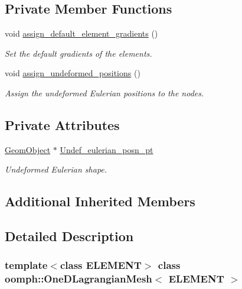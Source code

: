 \subsection*{Private Member Functions}
\begin{DoxyCompactItemize}
\item 
void \hyperlink{classoomph_1_1OneDLagrangianMesh_a7a4eabf4901a90b3015d2620fc70f648}{assign\+\_\+default\+\_\+element\+\_\+gradients} ()
\begin{DoxyCompactList}\small\item\em Set the default gradients of the elements. \end{DoxyCompactList}\item 
void \hyperlink{classoomph_1_1OneDLagrangianMesh_a1eebb0eddd75a7c2847615c05b5fb4d8}{assign\+\_\+undeformed\+\_\+positions} ()
\begin{DoxyCompactList}\small\item\em Assign the undeformed Eulerian positions to the nodes. \end{DoxyCompactList}\end{DoxyCompactItemize}
\subsection*{Private Attributes}
\begin{DoxyCompactItemize}
\item 
\hyperlink{classoomph_1_1GeomObject}{Geom\+Object} $\ast$ \hyperlink{classoomph_1_1OneDLagrangianMesh_af9b27f687d7ec160a01d6ed8c07570ed}{Undef\+\_\+eulerian\+\_\+posn\+\_\+pt}
\begin{DoxyCompactList}\small\item\em Undeformed Eulerian shape. \end{DoxyCompactList}\end{DoxyCompactItemize}
\subsection*{Additional Inherited Members}


\subsection{Detailed Description}
\subsubsection*{template$<$class E\+L\+E\+M\+E\+NT$>$\newline
class oomph\+::\+One\+D\+Lagrangian\+Mesh$<$ E\+L\+E\+M\+E\+N\+T $>$}

